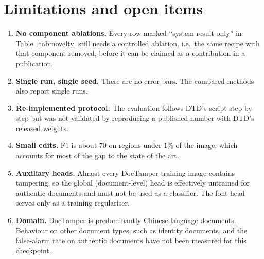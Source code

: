 \documentclass[10pt,a4paper]{article}
\begin{document}
\section{Limitations and open items}\label{sec:limits}
\begin{enumerate}
  \item \textbf{No component ablations.} Every row marked ``system result only'' in
        Table~\ref{tab:novelty} still needs a controlled ablation, i.e.\ the same recipe
        with that component removed, before it can be claimed as a contribution in a
        publication.
  \item \textbf{Single run, single seed.} There are no error bars. The compared methods
        also report single runs.
  \item \textbf{Re-implemented protocol.} The evaluation follows DTD's script step by step
        but was not validated by reproducing a published number with DTD's released
        weights.
  \item \textbf{Small edits.} F1 is about 70 on regions under 1\% of the image, which
        accounts for most of the gap to the state of the art.
  \item \textbf{Auxiliary heads.} Almost every DocTamper training image contains tampering,
        so the global (document-level) head is effectively untrained for authentic
        documents and must not be used as a classifier. The font head serves only as a
        training regulariser.
  \item \textbf{Domain.} DocTamper is predominantly Chinese-language documents. Behaviour on
        other document types, such as identity documents, and the false-alarm rate on
        authentic documents have not been measured for this checkpoint.
\end{enumerate}

\end{document}
